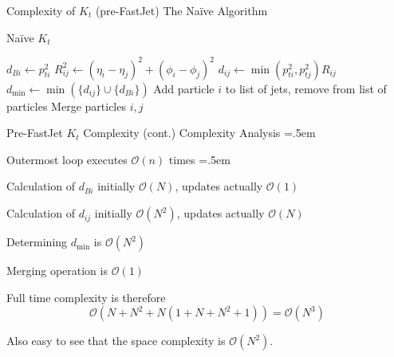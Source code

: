 \documentclass[xcolor={dvipsnames}]{beamer}
\let\olditemize=\itemize
\let\endolditemize=\enditemize
\renewenvironment{itemize}{\olditemize \itemsep=.5em }{\endolditemize}
\newcommand{\ord}[1]{\mathcal{O}(#1)}
\begin{document}
\begin{frame}{Complexity of $K_t$ (pre-FastJet)}
\alert{The Naïve Algorithm}
\begin{algorithm}[H]
    \caption{Naïve $K_t$}
    \begin{algorithmic}[1]
        \Repeat
                \State $d_{Bi} \gets p_{ti}^2$ 
                \State $R_{ij}^2 \gets (\eta_i - \eta_j)^2  + (\phi_i - \phi_j)^2$ 
                \State $d_{ij} \gets \min(p_{ti}^2, p_{tj}^2)R_{ij}$
            \EndFor
            \State $d_\text{min} \gets \min(\{d_{ij}\}\cup\{d_{Bi}\})$
                \State Add particle $i$ to list of jets, remove from list of particles
            \Else{}
                \State Merge particles $i, j$
            \EndIf
    \end{algorithmic}
\end{algorithm}
\end{frame}

\begin{frame}{Pre-FastJet $K_t$ Complexity (cont.)}
\alert{Complexity Analysis}
\begin{itemize}
    \item<2-> Outermost loop executes $\mathcal{O}(n)$ times
    \begin{itemize}
        \item<3-> Calculation of $d_{Bi}$ initially $\ord{N}$, updates actually $\ord{1}$
        \item<4-> Calculation of $d_{ij}$ initially $\ord{N^2}$, updates actually $\ord{N}$
        \item<5-> Determining $d_\text{min}$ is $\ord{N^2}$
        \item<6-> Merging operation is $\ord{1}$
    \end{itemize}
    \item<7-> Full time complexity is therefore \[ \ord{N + N^2 + N(1 + N + N^2 + 1)} = \ord{N^3} \]
    \item<8-> Also easy to see that the space complexity is $\ord{N^2}$.
\end{itemize}
\end{frame}
\end{document}
